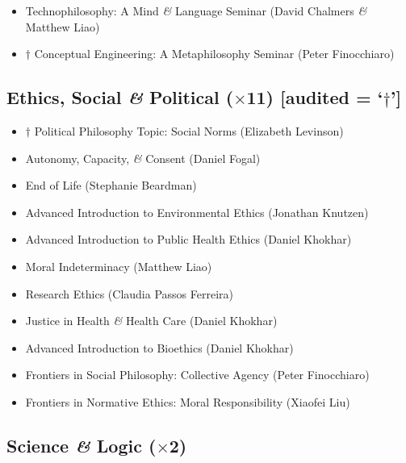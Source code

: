 \documentclass[10pt]{article}
\begin{document}
\begin{itemize}
\item Technophilosophy: A Mind \emph{\&} Language Seminar (David Chalmers \emph{\&} Matthew Liao)
\item \begin{math}\dagger\end{math} Conceptual Engineering: A Metaphilosophy Seminar (Peter Finocchiaro)
\end{itemize}

\subsection*{Ethics, Social \emph{\&} Political (\begin{math}\times\end{math}11) [audited = `\begin{math}\dagger\end{math}']}

\begin{itemize}
\item \begin{math}\dagger\end{math} Political Philosophy Topic: Social Norms (Elizabeth Levinson)
\item Autonomy, Capacity, \emph{\&} Consent (Daniel Fogal)
\item End of Life (Stephanie Beardman)
\item Advanced Introduction to Environmental Ethics (Jonathan Knutzen)
\item Advanced Introduction to Public Health Ethics (Daniel Khokhar)
\item Moral Indeterminacy (Matthew Liao)
\item Research Ethics (Claudia Passos Ferreira)
\item Justice in Health \emph{\&} Health Care (Daniel Khokhar)
\item Advanced Introduction to Bioethics (Daniel Khokhar)
\item Frontiers in Social Philosophy: Collective Agency (Peter Finocchiaro)
\item Frontiers in Normative Ethics: Moral Responsibility (Xiaofei Liu)
\end{itemize}

\subsection*{Science \emph{\&} Logic (\begin{math}\times\end{math}2)}
\end{document}
